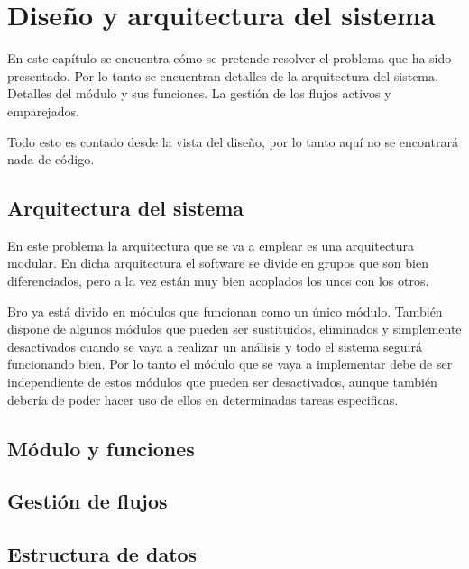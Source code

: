 \chapter{Diseño y arquitectura del sistema}

En este capítulo se encuentra cómo se pretende resolver el problema que ha sido presentado. Por lo tanto 
se encuentran detalles de la arquitectura del sistema. Detalles del módulo y sus funciones. La gestión de 
los flujos activos y emparejados.

\intro Todo esto es contado desde la vista del diseño, por lo tanto aquí no se encontrará nada de código.

\section{Arquitectura del sistema}

En este problema la arquitectura que se va a emplear es una arquitectura modular. En dicha arquitectura el software 
se divide en grupos que son bien diferenciados, pero a la vez están muy bien acoplados los unos con los otros.

\intro Bro ya está divido en módulos que funcionan como un único módulo. También dispone de algunos módulos 
que pueden ser sustituidos, eliminados y simplemente desactivados cuando se vaya a realizar un análisis y 
todo el sistema seguirá funcionando bien. Por lo tanto el módulo que se vaya a implementar debe de ser independiente 
de estos módulos que pueden ser desactivados, aunque también debería de poder hacer uso de ellos en determinadas 
tareas especificas.

\section{Módulo y funciones}

\section{Gestión de flujos}

\section{Estructura de datos}
